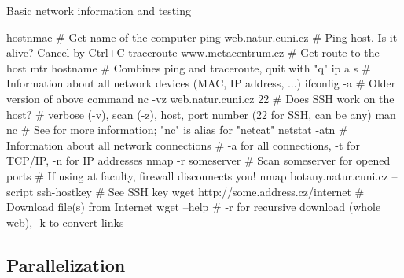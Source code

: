\documentclass[compress, ucs, xelatex, 11pt, xcolor=svgnames,
  hyperref={
    bookmarks=true,
    unicode=true,
    colorlinks=true,
    pdftitle={Linux, command line and MetaCentrum},
    plainpages=false,
    pdfauthor={Vojtech Zeisek},
    pdfsubject={Course about use of Linux command line, writing shell scripts and using MetaCentrum of CESNET},
    pdfcreator={XeLaTeX, http://www.xelatex.org/},
    pdfkeywords={Linux, GNU, BASH, shell, command line, MetaCentrum},
    linkcolor=Sienna,
    anchorcolor=black,
    citecolor=green,
    filecolor=magenta,
    menucolor=Sienna,
    urlcolor=cyan,
    pdftex},
  url={hyphens, lowtilde} %
  ]{beamer}
\begin{document}
\begin{frame}[fragile]{Basic network information and testing}
  \begin{bashcode}
    hostnmae # Get name of the computer
    ping web.natur.cuni.cz # Ping host. Is it alive? Cancel by Ctrl+C
    traceroute www.metacentrum.cz # Get route to the host
    mtr hostname # Combines ping and traceroute, quit with "q"
    ip a s # Information about all network devices (MAC, IP address, ...)
    ifconfig -a # Older version of above command
    nc -vz web.natur.cuni.cz 22 # Does SSH work on the host?
       # verbose (-v), scan (-z), host, port number (22 for SSH, can be any)
    man nc # See for more information; "nc" is alias for "netcat"
    netstat -atn # Information about all network connections
            # -a for all connections, -t for TCP/IP, -n for IP addresses
    nmap -r someserver # Scan someserver for opened ports
                       # If using at faculty, firewall disconnects you!
    nmap botany.natur.cuni.cz --script ssh-hostkey # See SSH key
    wget http://some.address.cz/internet # Download file(s) from Internet
    wget --help # -r for recursive download (whole web), -k to convert links
  \end{bashcode}
\end{frame}

\subsection{Parallelization}
\end{document}
